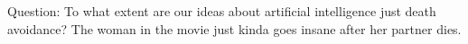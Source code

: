 Question:
To what extent are our ideas about artificial intelligence just death avoidance? 
The woman in the movie just kinda goes insane after her partner dies.